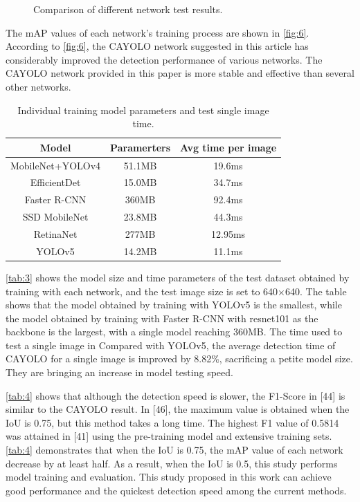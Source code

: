 \documentclass[sensors,article,submit,moreauthors]{Definitions/mdpi}
\begin{document}
\begin{figure}[H]
        \caption{Comparison of different network test results.\label{fig:9}}
    \end{figure}

    The mAP values of each network's training process are shown in \autoref{fig:6}. According to \autoref{fig:6}, the CAYOLO network suggested in this article has considerably improved the detection performance of various networks. The CAYOLO network provided in this paper is more stable and effective than several other networks.

    \begin{table}[H]
        \caption{Individual training model parameters and test single image time.\label{tab:3}}
        \begin{tabularx}{\textwidth}{CCC}
            \toprule
            \textbf{Model}   & \textbf{Paramerters} & \textbf{Avg time per image} \\
            \midrule
            MobileNet+YOLOv4 & 51.1MB               & 19.6ms                      \\
            EfficientDet     & 15.0MB               & 34.7ms                      \\
            Faster R-CNN     & 360MB                & 92.4ms                      \\
            SSD MobileNet    & 23.8MB               & 44.3ms                      \\
            RetinaNet        & 277MB                & 12.95ms                     \\
            YOLOv5           & 14.2MB               & 11.1ms                      \\
            \bottomrule
        \end{tabularx}
    \end{table}


    \autoref{tab:3} shows the model size and time parameters of the test dataset obtained by training with each network, and the test image size is set to 640×640. The table shows that the model obtained by training with YOLOv5 is the smallest, while the model obtained by training with Faster R-CNN with resnet101 as the backbone is the largest, with a single model reaching 360MB. The time used to test a single image in Compared with YOLOv5, the average detection time of CAYOLO for a single image is improved by 8.82\%, sacrificing a petite model size. They are bringing an increase in model testing speed.

    \autoref{tab:4} shows that although the detection speed is slower, the F1-Score in [44]\citep{pham2020road} is similar to the CAYOLO result. In [46]\citep{nienaber2015comparison}, the maximum value is obtained when the IoU is 0.75, but this method takes a long time. The highest F1 value of 0.5814 was attained in [41]\citep{Duan_2019_ICCV} using the pre-training model and extensive training sets. \autoref{tab:4} demonstrates that when the IoU is 0.75, the mAP value of each network decrease by at least half. As a result, when the IoU is 0.5, this study performs model training and evaluation. This study proposed in this work can achieve good performance and the quickest detection speed among the current methods.
\end{document}
